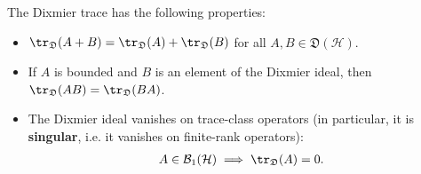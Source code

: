     \begin{property}
        The Dixmier trace has the following properties:
        \begin{itemize}
            \item $\tr_\mathfrak{D}(A+B)=\tr_\mathfrak{D}(A) + \tr_\mathfrak{D}(B)$ for all $A,B\in\mathfrak{D}(\mathcal{H})$.
            \item If $A$ is bounded and $B$ is an element of the Dixmier ideal, then $\tr_\mathfrak{D}(AB)=\tr_\mathfrak{D}(BA)$.
            \item The Dixmier ideal vanishes on trace-class operators (in particular, it is \textbf{singular}, i.e. it vanishes on finite-rank operators):
                \begin{gather}
                    A\in\mathcal{B}_1(\mathcal{H})\implies\tr_\mathfrak{D}(A)=0.
                \end{gather}
        \end{itemize}
    \end{property}
